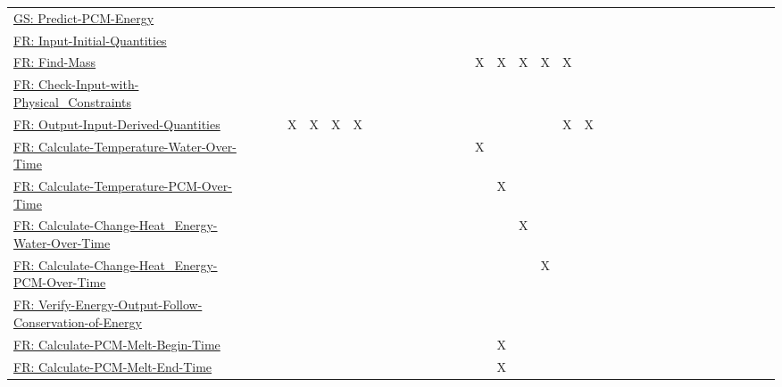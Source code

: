 \documentclass[12pt]{article}
\begin{document}
\begin{longtable}{l l l l l l l l l l l l l l l l l l l l l l l l l l l l l l l l l l l}
\\
\hyperref[pcmEnergyGS]{GS: Predict-PCM-Energy} &  &  &  &  &  &  &  &  &  &  &  &  &  &  &  &  &  &  &  &  &  &  &  &  &  &  &  &  &  &  &  &  &  & 
\\
\hyperref[inputInitQuants]{FR: Input-Initial-Quantities} &  &  &  &  &  &  &  &  &  &  &  &  &  &  &  &  &  &  &  &  &  &  &  &  &  &  &  &  &  &  &  &  &  & 
\\
\hyperref[findMass]{FR: Find-Mass} &  &  &  &  &  &  &  &  &  &  &  &  &  &  & X & X & X & X & X &  &  &  &  &  &  &  &  &  &  &  &  &  &  & 
\\
\hyperref[checkWithPhysConsts]{FR: Check-Input-with-Physical\_Constraints} &  &  &  &  &  &  &  &  &  &  &  &  &  &  &  &  &  &  &  &  &  &  &  &  &  &  &  &  &  &  &  &  &  & 
\\
\hyperref[outputInputDerivQuants]{FR: Output-Input-Derived-Quantities} &  &  & X & X & X & X &  &  &  &  &  &  &  &  &  &  &  &  & X & X &  &  &  &  &  &  &  &  &  &  &  &  &  & 
\\
\hyperref[calcTempWtrOverTime]{FR: Calculate-Temperature-Water-Over-Time} &  &  &  &  &  &  &  &  &  &  &  &  &  &  & X &  &  &  &  &  &  &  &  &  &  &  &  &  &  &  &  &  &  & 
\\
\hyperref[calcTempPCMOverTime]{FR: Calculate-Temperature-PCM-Over-Time} &  &  &  &  &  &  &  &  &  &  &  &  &  &  &  & X &  &  &  &  &  &  &  &  &  &  &  &  &  &  &  &  &  & 
\\
\hyperref[calcChgHeatEnergyWtrOverTime]{FR: Calculate-Change-Heat\_Energy-Water-Over-Time} &  &  &  &  &  &  &  &  &  &  &  &  &  &  &  &  & X &  &  &  &  &  &  &  &  &  &  &  &  &  &  &  &  & 
\\
\hyperref[calcChgHeatEnergyPCMOverTime]{FR: Calculate-Change-Heat\_Energy-PCM-Over-Time} &  &  &  &  &  &  &  &  &  &  &  &  &  &  &  &  &  & X &  &  &  &  &  &  &  &  &  &  &  &  &  &  &  & 
\\
\hyperref[verifyEnergyOutput]{FR: Verify-Energy-Output-Follow-Conservation-of-Energy} &  &  &  &  &  &  &  &  &  &  &  &  &  &  &  &  &  &  &  &  &  &  &  &  &  &  &  &  &  &  &  &  &  & 
\\
\hyperref[calcPCMMeltBegin]{FR: Calculate-PCM-Melt-Begin-Time} &  &  &  &  &  &  &  &  &  &  &  &  &  &  &  & X &  &  &  &  &  &  &  &  &  &  &  &  &  &  &  &  &  & 
\\
\hyperref[calcPCMMeltEnd]{FR: Calculate-PCM-Melt-End-Time} &  &  &  &  &  &  &  &  &  &  &  &  &  &  &  & X &  &  &  &  &  &  &  &  &  &  &  &  &  &  &  &  &  & 
\\

\end{longtable}
\end{document}
